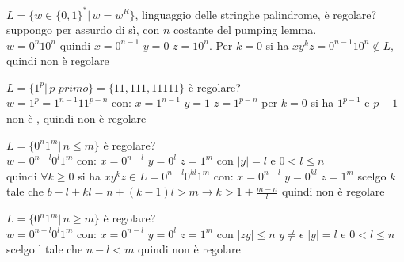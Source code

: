 	\begin{example}
		$L=\{w\in\{0,1\}^*|\, w=w^R\}$, linguaggio delle stringhe palindrome, è regolare?\\
		suppongo per assurdo di sì, con $n$ costante del pumping lemma.\\
		$w=0^n10^n$ quindi $x=0^{n-1}\,\,y=0\,\,z=10^n$.
		Per $k=0$ si ha $xy^kz=0^{n-1}10^n\not\in L$, quindi non è regolare
	\end{example}
	\begin{example}
		$L=\{1^p|\, p\,\,primo\}=\{11,111,11111\}$ è regolare?\\
		$w=1^p=1^{n-1}11^{p-n}$ con:
		$x=1^{n-1}\,\,y=1\,\,z=1^{p-n}$
		per $k=0$ si ha $1^{p-1}$ e $p-1$ non è , quindi non è regolare
	\end{example}
	\begin{example}
		$L=\{0^n1^m|\, n\leq m\}$ è regolare?\\
		$w=0^{n-l}0^l1^{m}$ con:
		$x=0^{n-l}\,\,y=0^l\,\,z=1^{m}$
		con $|y|=l$ e $0<l\leq n$\\
		quindi $\forall k\geq 0$ si ha $xy^kz\in L=0^{n-l}0^{kl}1^{m}$ con:
		$x=0^{n-l}\,\,y=0^{kl}\,\,z=1^{m}$
		scelgo $k$ tale che $b-l+kl=n+(k-1)l>m\to k> 1+\frac{m-n}{l}$ quindi non è regolare
	\end{example}
	\begin{example}
		$L=\{0^n1^m|\, n\geq m\}$ è regolare?\\
		$w=0^{n-l}0^l1^{m}$ con:
		$x=0^{n-l}\,\,y=0^l\,\,z=1^{m}$
		con $|zy|\leq n\,\,y\neq\epsilon\,\,|y|=l$ e $0<l\leq n$\\
		scelgo l tale che $n-l<m$ quindi non è regolare
	\end{example}

